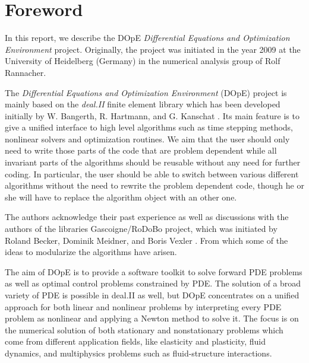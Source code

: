 \chapter{Foreword}
In this report, we describe the DOpE
\textit{Differential Equations and  Optimization Environment} project. 
Originally, the project was initiated in the year 2009 at the 
University of Heidelberg (Germany) in the numerical analysis
group of Rolf Rannacher. 

The \textit{Differential Equations and  Optimization Environment} (DOpE) project is 
mainly based on the \textit{deal.II} finite element library which has been developed
 initially by W. Bangerth, R. Hartmann, and G. Kanschat \cite{deal}.
Its main feature is to give a unified interface to high level algorithms such as 
time stepping methods, nonlinear solvers and optimization routines. 
We aim that the user should only need to write those parts
of the code that are problem dependent while all invariant parts of the algorithms
should be reusable without any need for further coding.
In particular, the user should be able to switch between various different 
algorithms without the need to rewrite the problem dependent code, though he or she will
have to replace the algorithm object with an other one. 

The authors acknowledge their past experience as well as discussions with 
the authors of the libraries 
Gascoigne/RoDoBo project, which was initiated by 
Roland Becker, Dominik Meidner,  and Boris Vexler \cite{rodobo}. 
From which some of the ideas to modularize the algorithms have arisen.

The aim of DOpE is to provide a software toolkit to solve forward PDE
problems as well as optimal control problems constrained by PDE. The
solution of a broad variety of PDE is possible in deal.II as well, but
DOpE concentrates on a unified approach for both linear and nonlinear
problems by interpreting every PDE problem as nonlinear and applying a
Newton method to solve it. 
The focus is on the numerical solution of both stationary and nonstationary
problems which come from different application fields, like elasticity and
plasticity, fluid dynamics, and multiphysics problems such as 
fluid-structure interactions.

